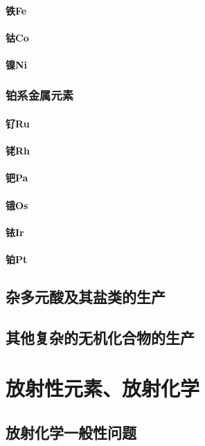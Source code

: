 \documentclass[UTF8]{../03-Chemistry}
\begin{document}
        \subsubsection{铁Fe}
        \subsubsection{钴Co}
        \subsubsection{镍Ni}
    \subsection{铂系金属元素}
        \subsubsection{钌Ru}
        \subsubsection{铑Rh}
        \subsubsection{钯Pa}
        \subsubsection{锇Os}
        \subsubsection{铱Ir}
        \subsubsection{铂Pt}

\section{杂多元酸及其盐类的生产}
\section{其他复杂的无机化合物的生产}



\chapter{放射性元素、放射化学}
\section{放射化学一般性问题}
\end{document}
